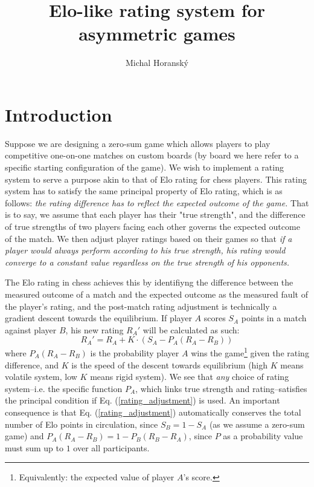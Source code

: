 \documentclass[12pt]{article}
\begin{document}
	\title{Elo-like rating system for asymmetric games}
	\author{Michal Horanský}
	\maketitle
	
	\section{Introduction}	
	
	Suppose we are designing a zero-sum game which allows players to play competitive one-on-one matches on custom boards (by board we here refer to a specific starting configuration of the game). We wish to implement a rating system to serve a purpose akin to that of Elo rating for chess players. This rating system has to satisfy the same principal property of Elo rating, which is as follows: \textit{the rating difference has to reflect the expected outcome of the game.} That is to say, we assume that each player has their "true strength", and the difference of true strengths of two players facing each other governs the expected outcome of the match. We then adjust player ratings based on their games so that \textit{if a player would always perform according to his true strength, his rating would converge to a constant value regardless on the true strength of his opponents.}
	
	The Elo rating in chess achieves this by identifiyng the difference between the measured outcome of a match and the expected outcome as the measured fault of the player's rating, and the post-match rating adjustment is technically a gradient descent towards the equilibrium. If player $A$ scores $S_A$ points in a match against player $B$, his new rating $R_A'$ will be calculated as such:
	\begin{equation} \label{rating_adjustment}		
	R_A' = R_A + K\cdot \left(S_A - P_A(R_A - R_B)\right)
	\end{equation}
where $P_A(R_A - R_B)$ is the probability player $A$ wins the game\footnote{Equivalently: the expected value of player $A$'s score.} given the rating difference, and $K$ is the speed of the descent towards equilibrium (high $K$ means volatile system, low $K$ means rigid system). We see that \textit{any} choice of rating system--i.e. the specific function $P_A$, which links true strength and rating--satisfies the principal condition if Eq. (\ref{rating_adjustment}) is used. An important consequence is that Eq. (\ref{rating_adjustment}) automatically conserves the total number of Elo points in circulation, since $S_B = 1 - S_A$ (as we assume a zero-sum game) and $P_A(R_A - R_B) = 1 - P_B(R_B - R_A)$, since $P$ as a probability value must sum up to $1$ over all participants.
\end{document}
